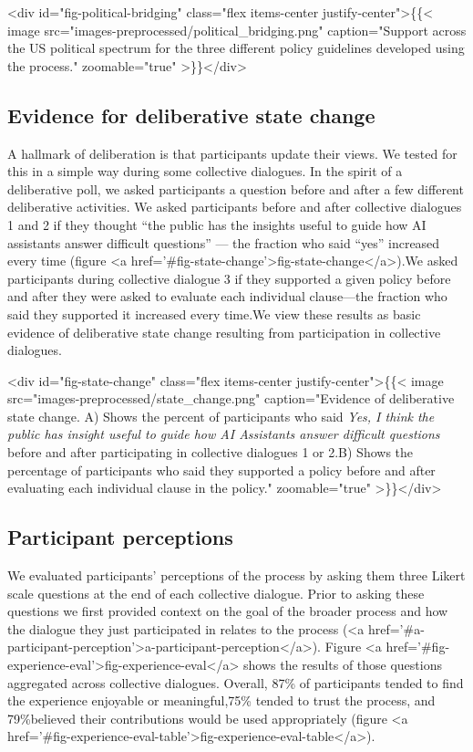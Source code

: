 \documentclass{article}
\begin{document}
<div id="fig-political-bridging" class="flex items-center justify-center">\{\{< image src="images-preprocessed/political_bridging.png" caption="Support across the US political spectrum for the three different policy guidelines developed using the process." zoomable="true" >\}\}</div>




\subsection{Evidence for deliberative state change}
A hallmark of deliberation is that participants update their views. We tested for this in a simple way during some collective dialogues. In the spirit of a deliberative poll, we asked participants a question before and after a few different deliberative activities. We asked participants before and after collective dialogues 1 and 2 if they thought “the public has the insights useful to guide how AI assistants answer difficult questions” --- the fraction who said “yes” increased every time (figure <a href='#fig-state-change'>fig-state-change</a>).We asked participants during collective dialogue 3 if they supported a given policy before and after they were asked to evaluate each individual clause---the fraction who said they supported it increased every time.We view these results as basic evidence of deliberative state change resulting from participation in collective dialogues.

<div id="fig-state-change" class="flex items-center justify-center">\{\{< image src="images-preprocessed/state_change.png" caption="Evidence of deliberative state change. A) Shows the percent of participants who said \emph{Yes, I think the public has insight useful to guide how AI Assistants answer difficult questions} before and after participating in collective dialogues 1 or 2.B) Shows the percentage of participants who said they supported a policy before and after evaluating each individual clause in the policy." zoomable="true" >\}\}</div>




\subsection{Participant perceptions}
We evaluated participants’ perceptions of the process by asking them three Likert scale questions at the end of each collective dialogue. Prior to asking these questions we first provided context on the goal of the broader process and how the dialogue they just participated in relates to the process (<a href='#a-participant-perception'>a-participant-perception</a>). Figure <a href='#fig-experience-eval'>fig-experience-eval</a> shows the results of those questions aggregated across collective dialogues. Overall, 87\% of participants tended to find the experience enjoyable or meaningful,75\% tended to trust the process, and 79\%believed their contributions would be used appropriately (figure <a href='#fig-experience-eval-table'>fig-experience-eval-table</a>). 
\end{document}
